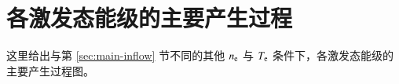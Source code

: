 \graphicspath{{figures/appendix-inflow/}}

\chapter{各激发态能级的主要产生过程}
\label{appendix:main-inflow}

这里给出与第 \ref{sec:main-inflow} 节不同的其他 $n_{\rm e}$ 与 $T_{\rm e}$ 条件下，各激发态能级的主要产生过程图。
\begin{center}
\\
\vspace{2em}
\\
\vspace{2em}
\end{center}